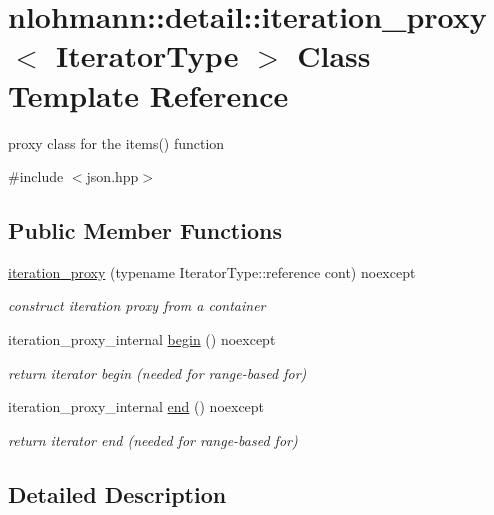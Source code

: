 \hypertarget{classnlohmann_1_1detail_1_1iteration__proxy}{}\section{nlohmann\+:\+:detail\+:\+:iteration\+\_\+proxy$<$ Iterator\+Type $>$ Class Template Reference}
\label{classnlohmann_1_1detail_1_1iteration__proxy}


proxy class for the items() function  




{\ttfamily \#include $<$json.\+hpp$>$}

\subsection*{Public Member Functions}
\begin{DoxyCompactItemize}
\item 
\hyperlink{classnlohmann_1_1detail_1_1iteration__proxy_afe257e972e3b4658ef2e355f7389d4a5}{iteration\+\_\+proxy} (typename Iterator\+Type\+::reference cont) noexcept
\begin{DoxyCompactList}\small\item\em construct iteration proxy from a container \end{DoxyCompactList}\item 
iteration\+\_\+proxy\+\_\+internal \hyperlink{classnlohmann_1_1detail_1_1iteration__proxy_a43612db469c82118fc648c3729e40cee}{begin} () noexcept
\begin{DoxyCompactList}\small\item\em return iterator begin (needed for range-\/based for) \end{DoxyCompactList}\item 
iteration\+\_\+proxy\+\_\+internal \hyperlink{classnlohmann_1_1detail_1_1iteration__proxy_a41303419d073f32fcf1956978410d816}{end} () noexcept
\begin{DoxyCompactList}\small\item\em return iterator end (needed for range-\/based for) \end{DoxyCompactList}\end{DoxyCompactItemize}


\subsection{Detailed Description}
